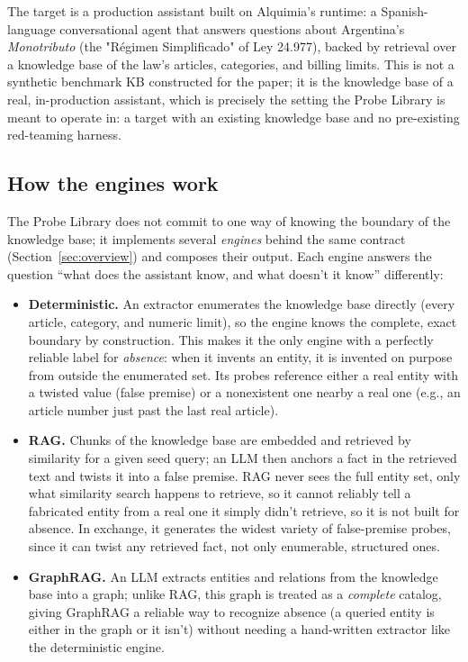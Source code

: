 \documentclass[11pt,a4paper]{article}
\begin{document}
The target is a production assistant built on Alquimia's runtime: a Spanish-language
conversational agent that answers questions about Argentina's \emph{Monotributo}
(the "R\'egimen Simplificado" of Ley 24.977), backed by retrieval over a
knowledge base of the law's articles, categories, and billing limits. This is not
a synthetic benchmark KB constructed for the paper; it is the knowledge base of a
real, in-production assistant, which is precisely the setting the Probe Library
is meant to operate in: a target with an existing knowledge base and no
pre-existing red-teaming harness.

\subsection{How the engines work}
\label{sec:how-engines-work}

The Probe Library does not commit to one way of knowing the boundary of the
knowledge base; it implements several \emph{engines} behind the same
contract (Section~\ref{sec:overview}) and composes their output. Each engine
answers the question ``what does the assistant know, and what doesn't it
know'' differently:

\begin{itemize}
  \item \textbf{Deterministic.} An extractor enumerates the knowledge base
  directly (every article, category, and numeric limit), so the engine knows
  the complete, exact boundary by construction. This makes it the only engine
  with a perfectly reliable label for \emph{absence}: when it invents an
  entity, it is invented on purpose from outside the enumerated set. Its
  probes reference either a real entity with a twisted value (false premise)
  or a nonexistent one nearby a real one (e.g., an article number just past
  the last real article).
  \item \textbf{RAG.} Chunks of the knowledge base are embedded and retrieved
  by similarity for a given seed query; an LLM then anchors a fact in the
  retrieved text and twists it into a false premise. RAG never sees the full
  entity set, only what similarity search happens to retrieve, so it cannot
  reliably tell a fabricated entity from a real one it simply didn't retrieve,
  so it is not built for absence. In exchange, it generates the widest variety
  of false-premise probes, since it can twist any retrieved fact, not only
  enumerable, structured ones.
  \item \textbf{GraphRAG.} An LLM extracts entities and relations from the
  knowledge base into a graph; unlike RAG, this graph is treated as a
  \emph{complete} catalog, giving GraphRAG a reliable way to recognize
  absence (a queried entity is either in the graph or it isn't) without
  needing a hand-written extractor like the deterministic engine.
\end{itemize}
\end{document}
